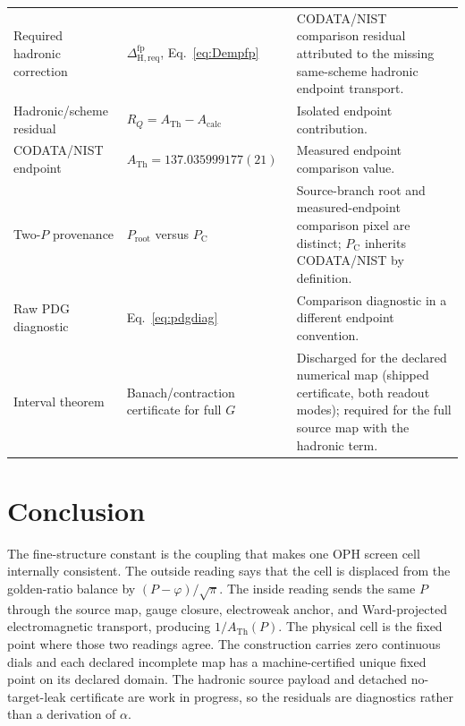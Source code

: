 \documentclass[11pt]{article}
\theoremstyle{remark}
\newcommand{\ATh}{A_{\mathrm{Th}}}
\newcommand{\Ppub}{P_{\mathrm C}}
\newcommand{\Rq}{R_Q}
\newcommand{\Dhadreq}{\Delta_{\mathrm{H,req}}}
\begin{document}
\begin{longtable}{@{}L{0.18\textwidth}L{0.44\textwidth}L{0.28\textwidth}@{}}
Required hadronic correction & \(\Dhadreq^{\mathrm{fp}}\), Eq.~\eqref{eq:Dempfp} & CODATA/NIST comparison residual attributed to the missing same-scheme hadronic endpoint transport. \\
Hadronic/scheme residual & \(\Rq=\ATh-A_{\mathrm{calc}}\) & Isolated endpoint contribution. \\
CODATA/NIST endpoint & \(\ATh=137.035999177(21)\) & Measured endpoint comparison value. \\
Two-\(P\) provenance & \(P_{\mathrm{root}}\) versus \(\Ppub\) & Source-branch root and measured-endpoint comparison pixel are distinct; \(\Ppub\) inherits CODATA/NIST by definition. \\
Raw PDG diagnostic & Eq.~\eqref{eq:pdgdiag} & Comparison diagnostic in a different endpoint convention. \\
Interval theorem & Banach/contraction certificate for full \(G\) & Discharged for the declared numerical map (shipped certificate, both readout modes); required for the full source map with the hadronic term. \\
\bottomrule
\end{longtable}

\section{Conclusion}

The fine-structure constant is the coupling that makes one OPH screen cell internally consistent. The outside reading says that the cell is displaced from the golden-ratio balance by \((P-\varphi)/\sqrt\pi\). The inside reading sends the same \(P\) through the source map, gauge closure, electroweak anchor, and Ward-projected electromagnetic transport, producing \(1/\ATh(P)\). The physical cell is the fixed point where those two readings agree. The construction carries zero continuous dials and each declared incomplete map has a machine-certified unique fixed point on its declared domain. The hadronic source payload and detached no-target-leak certificate are work in progress, so the residuals are diagnostics rather than a derivation of \(\alpha\).
\end{document}
